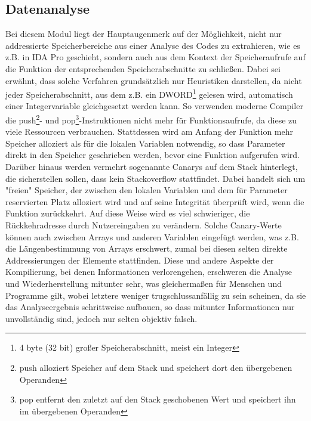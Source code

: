 \documentclass[11pt]{article} %
\begin{document}
\begin{multicols}{2}
\subsection{Datenanalyse}
Bei diesem Modul liegt der Hauptaugenmerk auf der Möglichkeit, nicht nur addressierte Speicherbereiche aus einer Analyse des Codes zu extrahieren, wie es z.B. in IDA Pro geschieht, sondern auch aus dem Kontext der Speicheraufrufe auf die Funktion der entsprechenden Speicherabschnitte zu schließen. Dabei sei erwähnt, dass solche Verfahren grundsätzlich nur Heuristiken darstellen, da nicht jeder Speicherabschnitt, aus dem z.B. ein DWORD\footnote{4 byte (32 bit) großer Speicherabschnitt, meist ein Integer} gelesen wird, automatisch einer Integervariable gleichgesetzt werden kann. So verwenden moderne Compiler die push\footnote{push alloziert Speicher auf dem Stack und speichert dort den übergebenen Operanden}- und pop\footnote{pop entfernt den zuletzt auf den Stack geschobenen Wert und speichert ihn im übergebenen Operanden}-Instruktionen nicht mehr für Funktionsaufrufe, da diese zu viele Ressourcen verbrauchen. Stattdessen wird am Anfang der Funktion mehr Speicher alloziert als für die lokalen Variablen notwendig, so dass Parameter direkt in den Speicher geschrieben werden, bevor eine Funktion aufgerufen wird. Darüber hinaus werden vermehrt sogenannte Canarys auf dem Stack hinterlegt, die sicherstellen sollen, dass kein Stackoverflow stattfindet. Dabei handelt sich um "freien" Speicher, der zwischen den lokalen Variablen und dem für Parameter reservierten Platz alloziert wird und auf seine Integrität überprüft wird, wenn die Funktion zurückkehrt. Auf diese Weise wird es viel schwieriger, die Rückkehradresse durch Nutzereingaben zu verändern. Solche Canary-Werte können auch zwischen Arrays und anderen Variablen eingefügt werden, was z.B. die Längenbestimmung von Arrays erschwert, zumal bei diesen selten direkte Addressierungen der Elemente stattfinden. Diese und andere Aspekte der Kompilierung, bei denen Informationen verlorengehen, erschweren die Analyse und Wiederherstellung mitunter sehr, was gleichermaßen für Menschen und Programme gilt, wobei letztere weniger trugschlussanfällig zu sein scheinen, da sie das Analyseergebnis schrittweise aufbauen, so dass mitunter Informationen nur unvollständig sind, jedoch nur selten objektiv falsch.





\end{multicols}
\end{document}
